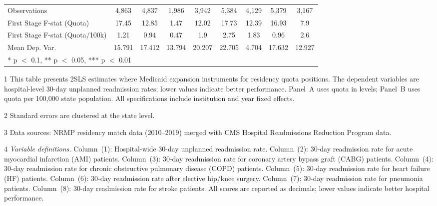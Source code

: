 \begin{table}[H]
{\begin{threeparttable}
\begin{tabular}[t]{lcccccccc}
\hspace{1em}Observations & 4,863 & 4,837 & 1,986 & 3,942 & 5,384 & 4,129 & 5,379 & 3,167\\
First Stage F-stat (Quota) & 17.45 & 12.85 & 1.47 & 12.02 & 17.73 & 12.39 & 16.93 & 7.9\\
First Stage F-stat (Quota/100k) & 1.21 & 0.94 & 0.47 & 1.9 & 2.75 & 1.83 & 0.96 & 2.6\\
Mean Dep. Var. & 15.791 & 17.412 & 13.794 & 20.207 & 22.705 & 4.704 & 17.632 & 12.927\\
\bottomrule
\multicolumn{9}{l}{\rule{0pt}{1em}* p $<$ 0.1, ** p $<$ 0.05, *** p $<$ 0.01}\\
\end{tabular}
\begin{tablenotes}
\item[1] \footnotesize{This table presents 2SLS estimates where Medicaid expansion instruments for
residency quota positions. The dependent variables are hospital-level 30-day unplanned readmission
rates; lower values indicate better performance. Panel~A uses quota in levels; Panel~B uses quota
per 100,000 state population. All specifications include institution and year fixed effects.}
\item[2] \footnotesize{Standard errors are clustered at the state level.}
\item[3] \footnotesize{Data sources: NRMP residency match data (2010--2019) merged with CMS
Hospital Readmissions Reduction Program data.}
\item[4] \footnotesize{\textit{Variable definitions.}
Column~(1): Hospital-wide 30-day unplanned readmission rate.
Column~(2): 30-day readmission rate for acute myocardial infarction (AMI) patients.
Column~(3): 30-day readmission rate for coronary artery bypass graft (CABG) patients.
Column~(4): 30-day readmission rate for chronic obstructive pulmonary disease (COPD) patients.
Column~(5): 30-day readmission rate for heart failure (HF) patients.
Column~(6): 30-day readmission rate after elective hip/knee surgery.
Column~(7): 30-day readmission rate for pneumonia patients.
Column~(8): 30-day readmission rate for stroke patients.
All scores are reported as decimals; lower values indicate better hospital performance.}
\end{tablenotes}
\end{threeparttable}}
\end{table}
